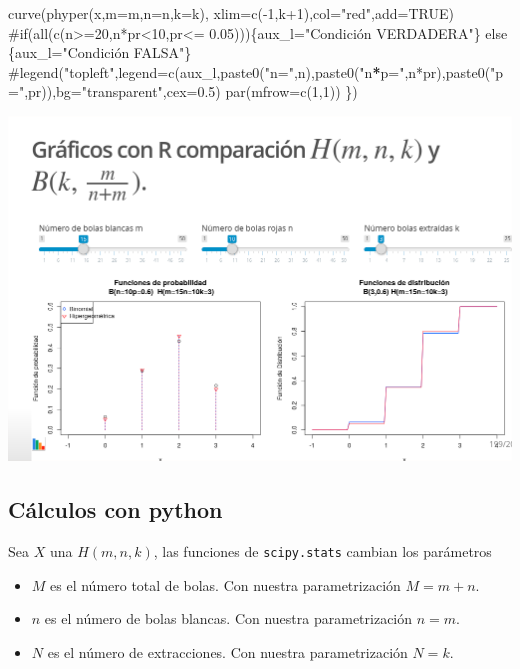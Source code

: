 \documentclass[]{book}
\newenvironment{Shaded}{\begin{snugshade}}{\end{snugshade}}
\newcommand{\DataTypeTok}[1]{\textcolor[rgb]{0.13,0.29,0.53}{#1}}
\newcommand{\NormalTok}[1]{#1}
\newcommand{\OperatorTok}[1]{\textcolor[rgb]{0.81,0.36,0.00}{\textbf{#1}}}
\newcommand{\StringTok}[1]{\textcolor[rgb]{0.31,0.60,0.02}{#1}}
\providecommand{\tightlist}{%
  \setlength{\itemsep}{0pt}\setlength{\parskip}{0pt}}
\begin{document}
\begin{Shaded}
\begin{Highlighting}[]
\StringTok{  curve(phyper(x,m=m,n=n,k=k),}
\StringTok{        xlim=c(-1,k+1),col="}\NormalTok{red}\StringTok{",add=TRUE)}
\StringTok{  #if(all(c(n>=20,n*pr<10,pr<= 0.05)))\{aux_l="}\NormalTok{Condición VERDADERA}\StringTok{"\} else \{aux_l="}\NormalTok{Condición FALSA}\StringTok{"\}}
\StringTok{  #legend("}\NormalTok{topleft}\StringTok{",legend=c(aux_l,paste0("}\DataTypeTok{n=}\StringTok{",n),paste0("}\NormalTok{n}\OperatorTok{*}\DataTypeTok{p=}\StringTok{",n*pr),paste0("}\DataTypeTok{p=}\StringTok{",pr)),bg="}\NormalTok{transparent}\StringTok{",cex=0.5)}
\StringTok{  par(mfrow=c(1,1))}
\StringTok{\})}
\end{Highlighting}
\end{Shaded}

\href{https://joanby.shinyapps.io/DistribucionesNotables/}{\includegraphics{Images/noshinyImages/interactivos_hipergeom_binom1.png}}

\hypertarget{cuxe1lculos-con-python-11}{%
\subsection{Cálculos con python}\label{cuxe1lculos-con-python-11}}

Sea \(X\) una \(H(m,n,k)\), las funciones de \texttt{scipy.stats} cambian los parámetros

\begin{itemize}
\tightlist
\item
  \(M\) es el número total de bolas. Con nuestra parametrización \(M=m+n\).
\item
  \(n\) es el número de bolas blancas. Con nuestra parametrización \(n=m\).
\item
  \(N\) es el número de extracciones. Con nuestra parametrización \(N=k\).
\end{itemize}
\end{document}
